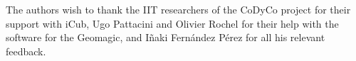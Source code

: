 \documentclass[utf8]{frontiersSCNS} %
\begin{document}
The authors wish to thank the IIT researchers of the CoDyCo project for their support with iCub, Ugo Pattacini and Olivier Rochel for their help with the software for the Geomagic, and Iñaki Fernández Pérez for all his relevant feedback.






\end{document}
